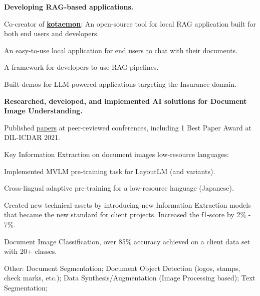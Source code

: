 \begin{xitemize}
    \item \textbf{Developing RAG-based applications.}
    \begin{zitemize}
        \item Co-creator of \href{https://github.com/Cinnamon/kotaemon}{\textbf{kotaemon}}: An
        open-source tool for local RAG application built for both end users and developers.
        \begin{zitemize}
            \vspace{1ex}
            \item An easy-to-use local application for end users to chat with their documents.
            \item A framework for developers to use RAG pipelines.
        \end{zitemize}
        \item Built demos for LLM-powered applications targeting the Insurance domain.
    \end{zitemize}
    \item \textbf{Researched, developed, and implemented AI solutions for Document Image Understanding.}
    \begin{zitemize}
        \item Published \href{https://scholar.google.com/citations?user=\gscholarid}{papers} at
        peer-reviewed conferences, including 1 Best Paper Award at DIL-ICDAR 2021.
        \item Key Information Extraction on document images low-resource languages:
        \vspace{1ex}
        \begin{zitemize}
            \item Implemented MVLM pre-training task for LayoutLM (and variants).
            \item Cross-lingual adaptive pre-training for a low-resource language (Japanese).
            \item Created new technical assets by introducing new Information Extraction models that
            became the new standard for client projects. Increased the f1-score by 2\% - 7\%.
        \end{zitemize}
        \item Document Image Classification, over 85\% accuracy achieved on a client data set with 20+ classes.
        \item Other: Document Segmentation; Document Object Detection (logos, stamps, check marks, etc.);
        Data Synthesis/Augmentation (Image Processing based); Text Segmentation;

\end{zitemize}
\end{xitemize}
